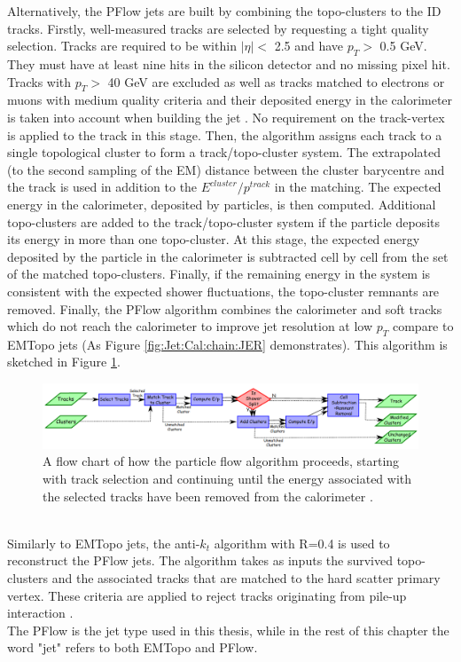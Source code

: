 Alternatively, the PFlow jets are built by combining the topo-clusters to the ID tracks. Firstly, well-measured tracks are selected by requesting a tight quality selection. Tracks are required to be within $|\eta|<$ 2.5 and have $p_T>$ 0.5 GeV. They must have at least nine hits in the silicon detector and no missing pixel hit. Tracks with $p_T>$ 40 GeV are excluded as well as tracks matched to electrons or muons with medium quality criteria and their deposited energy in the calorimeter is taken into account when building the jet \cite{PFlow_Reco}. No requirement on the track-vertex is applied to the track in this stage. Then, the algorithm assigns each track to a single topological cluster to form a track/topo-cluster system. The extrapolated (to the second sampling of the EM) distance between the cluster barycentre and the track is used in addition to the $E^{cluster}/p^{track}$ in the matching. The expected energy in the calorimeter, deposited by particles, is then computed. Additional topo-clusters are added to the track/topo-cluster system if the particle deposits its energy in more than one topo-cluster. At this stage, the expected energy deposited by the particle in the calorimeter is subtracted cell by cell from the set of the matched topo-clusters. Finally, if the remaining energy in the system is consistent with the expected shower fluctuations, the topo-cluster remnants are removed. Finally, the PFlow algorithm combines the calorimeter and soft tracks which do not reach the calorimeter to improve jet resolution at low $p_T$ compare to EMTopo jets (As Figure \ref{fig:Jet:Cal:chain:JER} demonstrates). This algorithm is sketched in Figure \ref{fig:Jet:JR:PFlowSketch}. 
\begin{figure}[htbp]
    \centering
    \includegraphics[width=1.\textwidth]{Ch4/Img/PFlow_Algo.png}
    \caption{A flow chart of how the particle flow algorithm proceeds, starting with track selection and continuing until the energy associated with the selected tracks have been removed from the calorimeter \cite{PFlow_Reco}.}
    \label{fig:Jet:JR:PFlowSketch}
\end{figure}
\\
Similarly to EMTopo jets, the anti-$k_t$ algorithm with R=0.4 is used to reconstruct the PFlow jets. The algorithm takes as inputs the survived topo-clusters and the associated tracks that are matched to the hard scatter primary vertex. These criteria are applied to reject tracks originating from pile-up interaction \cite{Jet_pileUp}. \\
The PFlow is the jet type used in this thesis, while in the rest of this chapter the word "jet" refers to both EMTopo and PFlow.

